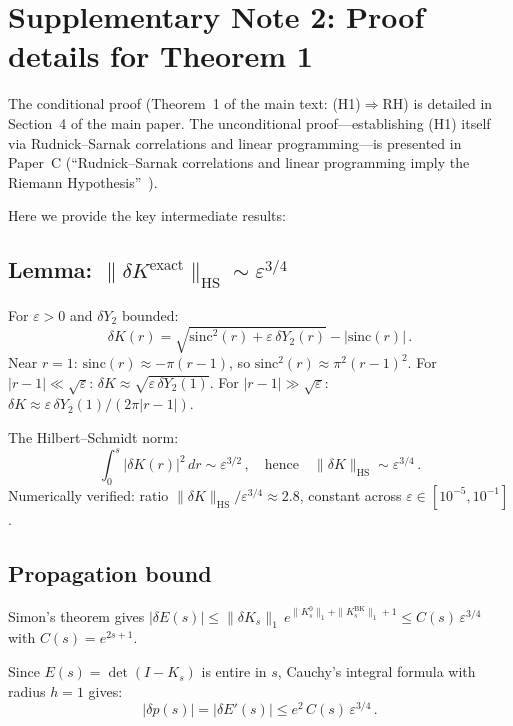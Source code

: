 \documentclass[10pt]{article}
\begin{document}
\section{Supplementary Note 2: Proof details for Theorem 1}

The conditional proof (Theorem~1 of the main text: (H1)$\Rightarrow$RH) is detailed
in Section~4 of the main paper. The unconditional proof---establishing (H1) itself
via Rudnick--Sarnak correlations and linear programming---is presented in Paper~C
(``Rudnick--Sarnak correlations and linear programming imply the Riemann Hypothesis''~\cite{alarcon2026c}).

Here we provide the key intermediate results:

\subsection{Lemma: $\|\delta K^{\mathrm{exact}}\|_{\mathrm{HS}} \sim \varepsilon^{3/4}$}

For $\varepsilon > 0$ and $\delta Y_2$ bounded:
\begin{equation}
\delta K(r) = \sqrt{\mathrm{sinc}^2(r) + \varepsilon\,\delta Y_2(r)} - |\mathrm{sinc}(r)|\,.
\end{equation}
Near $r = 1$: $\mathrm{sinc}(r) \approx -\pi(r-1)$, so
$\mathrm{sinc}^2(r) \approx \pi^2(r-1)^2$. For $|r-1| \ll \sqrt{\varepsilon}$:
$\delta K \approx \sqrt{\varepsilon\,\delta Y_2(1)}$. For $|r-1| \gg \sqrt{\varepsilon}$:
$\delta K \approx \varepsilon\,\delta Y_2(1)/(2\pi|r-1|)$.

The Hilbert--Schmidt norm:
\begin{equation}
\int_0^s |\delta K(r)|^2\,dr \sim \varepsilon^{3/2}\,,
\quad\text{hence}\quad \|\delta K\|_{\mathrm{HS}} \sim \varepsilon^{3/4}\,.
\end{equation}
Numerically verified: ratio $\|\delta K\|_{\mathrm{HS}} / \varepsilon^{3/4}
\approx 2.8$, constant across $\varepsilon \in [10^{-5}, 10^{-1}]$.

\subsection{Propagation bound}

Simon's theorem gives $|\delta E(s)| \leq \|\delta K_s\|_1\,e^{\|K^0_s\|_1 + \|K^{\mathrm{BK}}_s\|_1 + 1}
\leq C(s)\,\varepsilon^{3/4}$ with $C(s) = e^{2s+1}$.

Since $E(s) = \det(I - K_s)$ is entire in $s$, Cauchy's integral formula with
radius $h = 1$ gives:
\begin{equation}
|\delta p(s)| = |\delta E'(s)| \leq e^2\,C(s)\,\varepsilon^{3/4}\,.
\end{equation}
\end{document}
